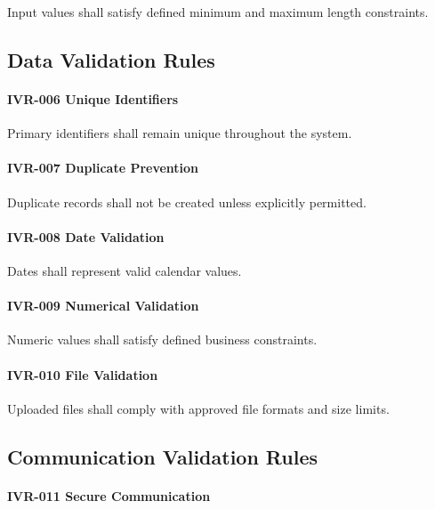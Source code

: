 Input values shall satisfy defined minimum and maximum length
constraints.


\subsection{Data Validation Rules}

\paragraph{IVR-006 Unique Identifiers}

Primary identifiers shall remain unique throughout the system.

\paragraph{IVR-007 Duplicate Prevention}

Duplicate records shall not be created unless explicitly permitted.

\paragraph{IVR-008 Date Validation}

Dates shall represent valid calendar values.

\paragraph{IVR-009 Numerical Validation}

Numeric values shall satisfy defined business constraints.

\paragraph{IVR-010 File Validation}

Uploaded files shall comply with approved file formats and size limits.


\subsection{Communication Validation Rules}

\paragraph{IVR-011 Secure Communication}

